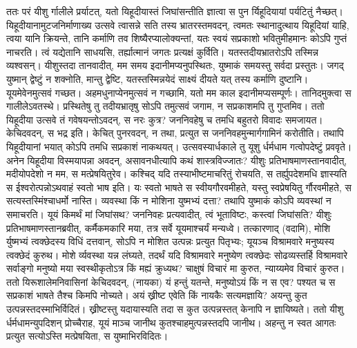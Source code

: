 \adhyAya
{}
\vakya ततः परं यीशु र्गालीले प्रर्याटत्, यतो यिहूदीयास्तं जिघांसन्तीति ज्ञात्वा स पुन र्यिहूदियायां पर्यटितुं नैच्छत्।
\vakya यिहूदीयानामुटजनिर्माणाख्य उत्सवे त्वासन्ने सति तस्य भ्रातरस्तमवदन्,
\vakya त्वमतः स्थानादुत्थाय यिहूदियां याहि, त्वया यानि क्रियन्ते, तानि कर्माणि तव शिष्यैरप्यालोक्यन्तां,
\vakya यतः स्वयं सप्रकाशो भवितुमीहमानः कोऽपि गुप्तं नाचरति। त्वं यद्येतानि साधयसि, तर्ह्यात्मानं जगतः प्रत्यक्षं कुर्विति।
\vakya यतस्तदीयभ्रातरोऽपि तस्मिन्न व्यश्वसन्।
\vakya यीशुस्तदा तानवादीत्, मम समय इदानीमप्यनुपस्थितः, युष्माकं समयस्तु सर्वदा प्रस्तुतः।
\vakya जगद् युष्मान् द्वेष्टुं न शक्नोति, मान्तु द्वेष्टि, यतस्तस्मिन्नयेदं साक्ष्यं दीयते यत् तस्य कर्माणि दुष्टानि।
\vakya यूयमेवेनमुत्सवं गच्छत। अहमधुनाप्येनमुत्सवं न गच्छामि, यतो मम काल इदानीमप्यसम्पूर्णः।
\vakya तानिदमुक्त्वा स गालीलेऽवतस्थे।
\vakya प्रस्थितेषु तु तदीयभ्रातृषु सोऽपि तमुत्सवं जगाम, न सप्रकाशमपि तु गुप्तमिव।
\vakya ततो यिहूदीया उत्सवे तं गवेषयन्तोऽवदन्, स नरः कुत्र?
\vakya जननिवहेषु च तमधि बहुतरो विवादः समजायत। केचिदवदन्, स भद्र इति। केचित् पुनरवदन्, न तथा, प्रत्युत स जननिवहमुन्मार्गगामिनं करोतीति।
\vakya तथापि यिहूदीयानां भयात् कोऽपि तमधि सप्रकाशं नाकथयत्।
\vakya उत्सवस्यार्धकाले तु यूशु र्धर्मधाम गत्वोपदेष्टुं प्रववृते।
\vakya अनेन यिहूदीया विस्मयापन्ना अवदन्, असावनधीत्यापि कथं शास्त्रविज्जातः?
\vakya यीशुः प्रतिभाषमाणस्तानवादीत्, मदीयोपदेशो न मम, स मत्प्रेषयितुरेव।
\vakya कश्चिद् यदि तस्याभीष्टमाचरितुं रोचयति, स तर्ह्युपदेशमधि ज्ञास्यति स ईश्वरोत्पन्नोऽथवाहं स्वतो भाष इति।
\vakya यः स्वतो भाषते स स्वीयगौरवमीहते, यस्तु स्वप्रेषयितु र्गौरवमीहते, स सत्यस्तस्मिंश्चाधर्मो नास्ति।
\vakya व्यवस्था किं न मोशिना युष्मभ्यं दत्ता? तथापि युष्माकं कोऽपि व्यवस्थां न समाचरति। यूयं किमर्थं मां जिघांसथ?
\vakya जननिवहः प्रत्यवादीत्, त्वं भूताविष्टः, कस्त्वां जिघांसति?
\vakya यीशुः प्रतिभाषमाणस्तानब्रवीत्, कर्मैकमकारि मया, तत्र सर्वे यूयमाश्चर्यं मन्यध्वे।
\vakya तत्कारणाद् (वदामि), मोशि र्युष्मभ्यं त्वक्छेदस्य विधिं दत्तवान्, सोऽपि न मोशित उत्पन्नः प्रत्युत पितृभ्यः; यूयञ्च विश्रामवारे मनुष्यस्य त्वक्छेदं कुरुथ।
\vakya मोशे र्व्यवस्था यन्न लंघ्यते, तदर्थं यदि विश्रामवारे मनुष्येण त्वक्छेदः सोढव्यस्तर्हि विश्रामवारे सर्वाङ्गो मनुष्यो मया स्वस्थीकृतोऽत्र किं मह्यं क्रुध्यथ?
\vakya चाक्षुषं विचारं मा कुरुत, न्याय्यमेव विचारं कुरुत।
\vakya ततो यिरूशालेमनिवासिनां केचिदवदन्, (नायका) यं हन्तुं यतन्ते, मनुष्योऽयं किं न स एव?
\vakya पश्यत च स सप्रकाशं भाषते तैश्च किमपि नोच्यते। अयं ख्रीष्ट एवेति किं नायकैः सत्यमज्ञायि?
\vakya अयन्तु कुत उत्पन्नस्तदस्माभिर्विदितं। ख्रीष्टस्तु यदायास्यति तदा स कुत उत्पन्नस्तत् केनापि न ज्ञायिष्यते।
\vakya ततो यीशु र्धर्मधामन्युपदिशन् प्रोच्चैराह, यूयं माञ्च जानीथ कुतश्चाहमुत्पन्नस्तदपि जानीथ। अहन्तु न स्वत आगतः प्रत्युत सत्योऽस्ति मत्प्रेषयिता, स युष्माभिरविदितः।
